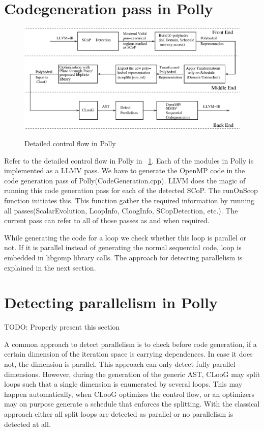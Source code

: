 \section{Codegeneration pass in Polly}
\begin{figure}
\begin{center}
  \label{detailed}
  \includegraphics[width=1\textwidth]{images/detailedarch.eps}
  \caption{Detailed control flow in Polly}
\end{center}
\end{figure}
Refer to the detailed control flow in Polly in ~\ref{detailed}. Each of the modules in Polly is
implemented as a LLMV pass\cite{llvmpass}. We have to generate the OpenMP code in the code 
generation pass of Polly(CodeGeneration.cpp). LLVM does the magic of running this code generation
pass for each of the detected SCoP. The runOnScop function initiates this. This function gather
the required information by running all passes(ScalarEvolution, LoopInfo, CloogInfo, SCopDetection, etc.).
The current pass can refer to all of those passes as and when required. 

While generating the code for a loop we check whether this loop is parallel or not.  If it is
parallel instead of generating the normal sequential code,  loop is embedded in
libgomp library calls. The approach for detecting parallelism is explained in the next section.

\section{Detecting parallelism in Polly}

TODO: Properly present this section

A common approach to detect
parallelism is to check before code generation, if a certain dimension of the
iteration space is carrying dependences. In case it does not, the dimension is
parallel.  This approach can only detect fully parallel dimensions. However,
during the generation of the generic AST, CLooG may split loops such that a
single dimension is enumerated by several loops.  This may happen
automatically, when CLooG optimizes the control flow, or an optimizers may on
purpose generate a schedule that enforces the splitting.  With the classical
approach either all split loops are detected as parallel or no parallelism is
detected at all.

